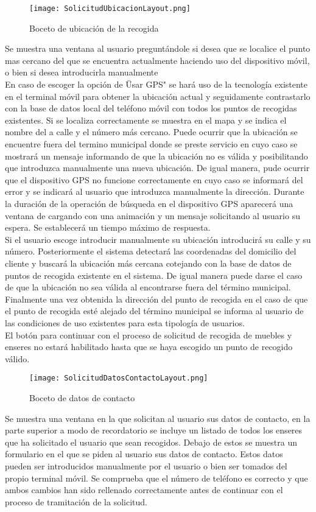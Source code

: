  \begin{figure}[H]
\centering
	\texttt{[image: SolicitudUbicacionLayout.png]} 
\caption{Boceto de ubicación de la recogida}
\end{figure}
Se muestra una ventana al usuario preguntándole si desea que se localice el punto mas cercano del que se encuentra actualmente haciendo uso del dispositivo móvil, o bien si desea introducirla manualmente \\
En caso de escoger la opción de \"Usar GPS" se hará uso de la tecnología existente en el terminal móvil para obtener la ubicación actual y seguidamente contrastarlo con la base de datos local del teléfono móvil con todos los puntos de recogidas existentes. Si se localiza correctamente se muestra en el mapa y se indica el nombre del a calle y el número más cercano. Puede ocurrir que la ubicación se encuentre fuera del termino municipal donde se preste servicio en cuyo caso se mostrará un mensaje informando de que la ubicación no es válida y posibilitando que introduzca manualmente una nueva ubicación. De igual manera, pude ocurrir que el dispositivo GPS no funcione correctamente en cuyo caso se informará del error y se indicará al usuario que introduzca manualmente la dirección. Durante la duración de la operación de búsqueda en el dispositivo GPS aparecerá una ventana de cargando con una animación y un mensaje solicitando al usuario su espera. Se establecerá un tiempo máximo de respuesta.  \\
Si el usuario escoge introducir manualmente su ubicación introducirá su calle y su número. Posteriormente el sistema detectará las coordenadas del domicilio del cliente y buscará la ubicación más cercana cotejando con la base de datos de puntos de recogida existente en el sistema. De igual manera puede darse el caso de que la ubicación no sea válida al encontrarse fuera del término municipal.  \\
Finalmente una vez obtenida la dirección del punto de recogida en el caso de que el punto de recogida esté alejado del término municipal se informa al usuario de las condiciones de uso existentes para esta tipología de usuarios.  \\
El botón para continuar con el proceso de solicitud de recogida de muebles y enseres no estará habilitado hasta que se haya escogido un punto de recogido válido. 

 \begin{figure}[H]
\centering
	\texttt{[image: SolicitudDatosContactoLayout.png]} 
\caption{Boceto de datos de contacto}
\end{figure}
Se muestra una ventana en la que solicitan al usuario sus datos de contacto, en la parte superior a modo de recordatorio se incluye un listado de todos los enseres que ha solicitado el usuario que sean recogidos. Debajo de estos se muestra un formulario en el que se piden al usuario sus datos de contacto. Estos datos pueden ser introducidos manualmente por el usuario o bien ser tomados del propio terminal móvil. Se comprueba que el número de teléfono es correcto y que ambos cambios han sido rellenado correctamente antes de continuar con el proceso de tramitación de la solicitud. 

